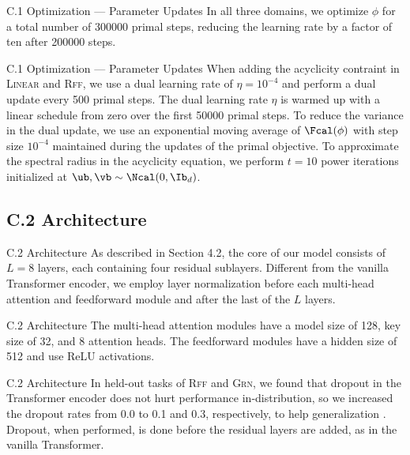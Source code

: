 \documentclass[aspectratio=169,10pt]{beamer}
\newcommand{\domain}[1]{\textsc{#1}}
\newcommand{\lineardomain}{\domain{Linear}\xspace}
\newcommand{\rffdomain}{\domain{Rff}\xspace}
\newcommand{\grndomain}{\domain{Grn}\xspace}
\newcommand{\ood}{\text{o.o.d.}\xspace}
\begin{document}
\begin{frame}{C.1 Optimization --- Parameter Updates}
In all three domains, we optimize $\phi$ for a total number of \num{300000} primal steps, reducing the learning rate by a factor of ten after \num{200000} steps.
\end{frame}

\begin{frame}{C.1 Optimization --- Parameter Updates}
\small
When adding the acyclicity contraint in \lineardomain and \rffdomain, we use a dual learning rate of $\eta = 10^{-4}$ and perform a dual update every \num{500} primal steps. The dual learning rate $\eta$ is warmed up with a linear schedule from zero over the first \num{50000} primal steps. To reduce the variance in the dual update, we use an exponential moving average of $\Fcal(\phi)$ with step size $10^{-4}$ maintained during the updates of the primal objective. To approximate the spectral radius in the acyclicity equation, we perform $t=10$ power iterations initialized at $\ub, \vb \sim \Ncal(0, \Ib_d)$.
\end{frame}

\subsection{C.2 Architecture}

\begin{frame}{C.2 Architecture}
As described in Section 4.2, the core of our model consists of $L=8$ layers, each containing four residual sublayers. Different from the vanilla Transformer encoder, we employ layer normalization before each multi-head attention and feedforward module and after the last of the $L$ layers.
\end{frame}

\begin{frame}{C.2 Architecture}
The multi-head attention modules have a model size of \num{128}, key size of \num{32}, and \num{8} attention heads. The feedforward modules have a hidden size of \num{512} and use ReLU activations.
\end{frame}

\begin{frame}{C.2 Architecture}
\small
In held-out tasks of \rffdomain and \grndomain, we found that dropout in the Transformer encoder does not hurt performance in-distribution, so we increased the dropout rates from \num{0.0} to \num{0.1} and \num{0.3}, respectively, to help generalization \ood. Dropout, when performed, is done before the residual layers are added, as in the vanilla Transformer.
\end{frame}
\end{document}
